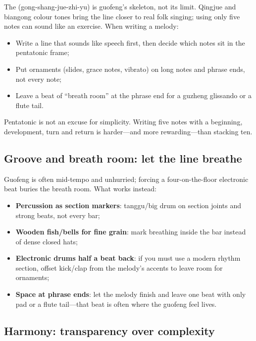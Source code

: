 The  (gong-shang-jue-zhi-yu) is guofeng's skeleton, not its limit. Qingjue and biangong colour tones bring the line closer to real folk singing; using only five notes can sound like an exercise. When writing a melody:

\begin{itemize}
\item Write a line that sounds like speech first, then decide which notes sit in the pentatonic frame;
\item Put ornaments (slides, grace notes, vibrato) on long notes and phrase ends, not every note;
\item Leave a beat of ``breath room'' at the phrase end for a guzheng glissando or a flute tail.
\end{itemize}

Pentatonic is not an excuse for simplicity. Writing five notes with a beginning, development, turn and return is harder---and more rewarding---than stacking ten.

\subsection{Groove and breath room: let the line breathe}
\label{sec:guofeng-groove}

Guofeng is often mid-tempo and unhurried; forcing a four-on-the-floor electronic beat buries the breath room. What works instead:

\begin{itemize}
\item \textbf{Percussion as section markers}: tanggu/big drum on section joints and strong beats, not every bar;
\item \textbf{Wooden fish/bells for fine grain}: mark breathing inside the bar instead of dense closed hats;
\item \textbf{Electronic drums half a beat back}: if you must use a modern rhythm section, offset kick/clap from the melody's accents to leave room for ornaments;
\item \textbf{Space at phrase ends}: let the melody finish and leave one beat with only pad or a flute tail---that beat is often where the guofeng feel lives.
\end{itemize}

\subsection{Harmony: transparency over complexity}
\label{sec:guofeng-harmony}

